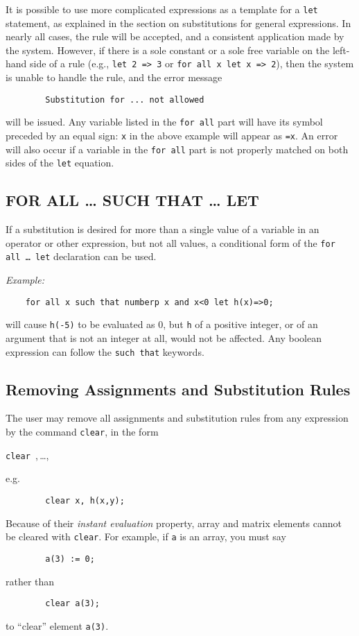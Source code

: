 It is possible to use more complicated expressions as a template for a
\texttt{let} statement, as explained in the section on substitutions for
general expressions.  In nearly all cases, the rule will be accepted, and
a consistent application made by the system.  However, if there is a sole
constant or a sole free variable on the left-hand side of a rule (e.g.,
\texttt{let 2 => 3} or \texttt{for all x let x => 2}), then the system is unable to
handle the rule, and the error message
\begin{verbatim}
        Substitution for ... not allowed
\end{verbatim}
will be issued.  Any variable listed in the \texttt{for all} part will have
its symbol preceded by an equal sign: \texttt{x} in the above example will
appear as \texttt{=x}.  An error will also occur if a variable in the
\texttt{for all} part is not properly matched on both sides of the \texttt{let}
equation.

\subsection{FOR ALL \ldots{} SUCH THAT \ldots{} LET}
\hypertarget{command:SUCHTHAT}{}

If a substitution is desired for more than a single value of a variable in
an operator or other expression, but not all values, a conditional form of
the \texttt{for all \ldots{} let} declaration can be used.

\textit{Example:}
\begin{verbatim}
    for all x such that numberp x and x<0 let h(x)=>0;
\end{verbatim}
will cause \texttt{h(-5)} to be evaluated as 0, but \texttt{h} of a positive
integer, or of an argument that is not an integer at all, would not be
affected.  Any boolean expression can follow the \texttt{such that} keywords.

\hypertarget{reserved:CLEAR}{\subsection{Removing Assignments and Substitution Rules}}

The user may remove all assignments and substitution rules from any
expression by the command \texttt{clear}, in the form
\begin{syntax}
  \texttt{clear },\,\dots,\,
\end{syntax}
e.g.
\begin{verbatim}
        clear x, h(x,y);
\end{verbatim}
Because of their \emph{instant evaluation} property, array and matrix elements
cannot be cleared with \texttt{clear}.  For example, if \texttt{a} is an array,
you must say
\begin{verbatim}
        a(3) := 0;
\end{verbatim}
rather than
\begin{verbatim}
        clear a(3);
\end{verbatim}
to ``clear'' element \texttt{a(3)}.

